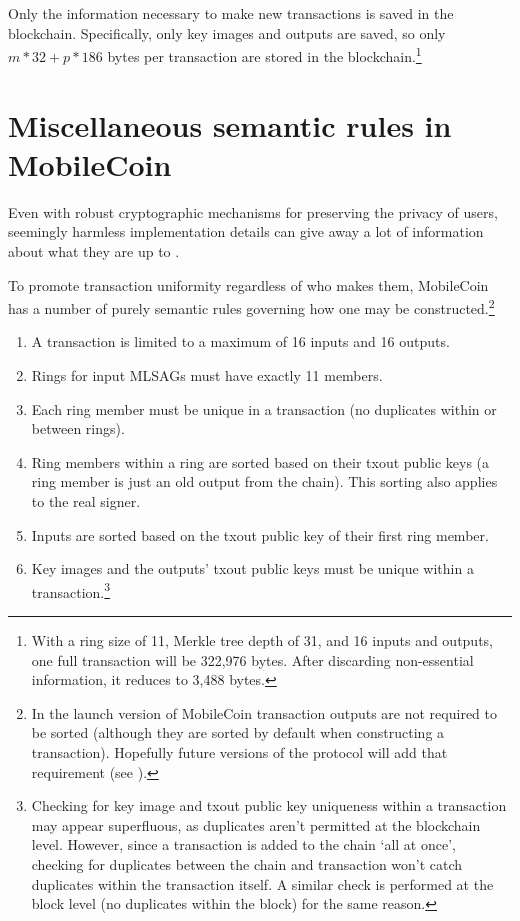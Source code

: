 Only the information necessary to make new transactions is saved in the blockchain. Specifically, only key images and outputs are saved, so only $m*32 + p*186$ bytes per transaction are stored in the blockchain.\footnote{With a ring size of 11, Merkle tree depth of 31, and 16 inputs and outputs, one full transaction will be 322,976 bytes. After discarding non-essential information, it reduces to 3,488 bytes.}

\section{Miscellaneous semantic rules in MobileCoin}
\label{sec:misc-semantic-rules}

Even with robust cryptographic mechanisms for preserving the privacy of users, seemingly harmless implementation details can give away a lot of information about what they are up to \cite{monero-tx-extra-statistics,update-tx-supplement-proposal-monero}.

To promote transaction uniformity regardless of who makes them, MobileCoin has a number of purely semantic rules governing how one may be constructed.\footnote{In the launch version of MobileCoin transaction outputs are not required to be sorted (although they are sorted by default when constructing a transaction). Hopefully future versions of the protocol will add that requirement (see \cite{mc-pull-request-validate-sorted-outputs-in-tx}).}

\begin{enumerate}
    \item A transaction is limited to a maximum of 16 inputs and 16 outputs.
    \item Rings for input MLSAGs must have exactly 11 members.
    \item Each ring member must be unique in a transaction (no duplicates within or between rings).
    \item Ring members within a ring are sorted based on their txout public keys (a ring member is just an old output from the chain). This sorting also applies to the real signer.
    \item Inputs are sorted based on the txout public key of their first ring member.
    \item Key images and the outputs' txout public keys must be unique within a transaction.\footnote{Checking for key image and txout public key uniqueness within a transaction may appear superfluous, as duplicates aren't permitted at the blockchain level. However, since a transaction is added to the chain `all at once', checking for duplicates between the chain and transaction won't catch duplicates within the transaction itself. A similar check is performed at the block level (no duplicates within the block) for the same reason.}
\end{enumerate}



